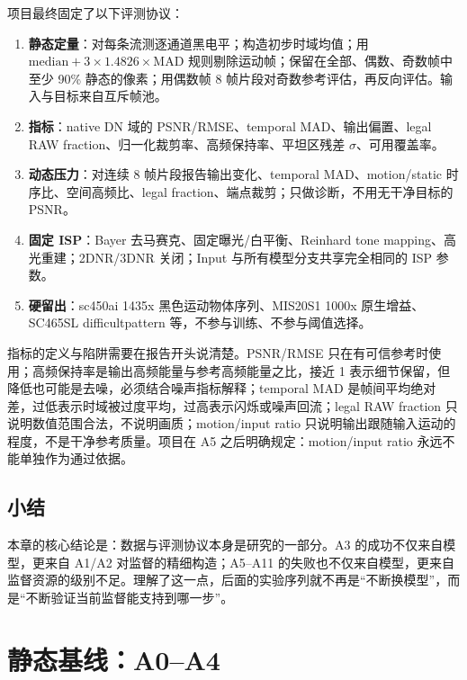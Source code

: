 \documentclass[11pt,a4paper,UTF8,fontset=fandol]{ctexart}
\begin{document}
项目最终固定了以下评测协议：

\begin{enumerate}
  \item \textbf{静态定量}：对每条流测逐通道黑电平；构造初步时域均值；用 $\mathrm{median}+3\times1.4826\times\mathrm{MAD}$ 规则剔除运动帧；保留在全部、偶数、奇数帧中至少 90\% 静态的像素；用偶数帧 8 帧片段对奇数参考评估，再反向评估。输入与目标来自互斥帧池。
  \item \textbf{指标}：native DN 域的 PSNR/RMSE、temporal MAD、输出偏置、legal RAW fraction、归一化裁剪率、高频保持率、平坦区残差 $\sigma$、可用覆盖率。
  \item \textbf{动态压力}：对连续 8 帧片段报告输出变化、temporal MAD、motion/static 时序比、空间高频比、legal fraction、端点裁剪；只做诊断，不用无干净目标的 PSNR。
  \item \textbf{固定 ISP}：Bayer 去马赛克、固定曝光/白平衡、Reinhard tone mapping、高光重建；2DNR/3DNR 关闭；Input 与所有模型分支共享完全相同的 ISP 参数。
  \item \textbf{硬留出}：sc450ai 1435x 黑色运动物体序列、MIS20S1 1000x 原生增益、SC465SL difficultpattern 等，不参与训练、不参与阈值选择。
\end{enumerate}

指标的定义与陷阱需要在报告开头说清楚。PSNR/RMSE 只在有可信参考时使用；高频保持率是输出高频能量与参考高频能量之比，接近 1 表示细节保留，但降低也可能是去噪，必须结合噪声指标解释；temporal MAD 是帧间平均绝对差，过低表示时域被过度平均，过高表示闪烁或噪声回流；legal RAW fraction 只说明数值范围合法，不说明画质；motion/input ratio 只说明输出跟随输入运动的程度，不是干净参考质量。项目在 A5 之后明确规定：motion/input ratio 永远不能单独作为通过依据。

\subsection{小结}

本章的核心结论是：数据与评测协议本身是研究的一部分。A3 的成功不仅来自模型，更来自 A1/A2 对监督的精细构造；A5--A11 的失败也不仅来自模型，更来自监督资源的级别不足。理解了这一点，后面的实验序列就不再是“不断换模型”，而是“不断验证当前监督能支持到哪一步”。

\section{静态基线：A0--A4}
\end{document}
